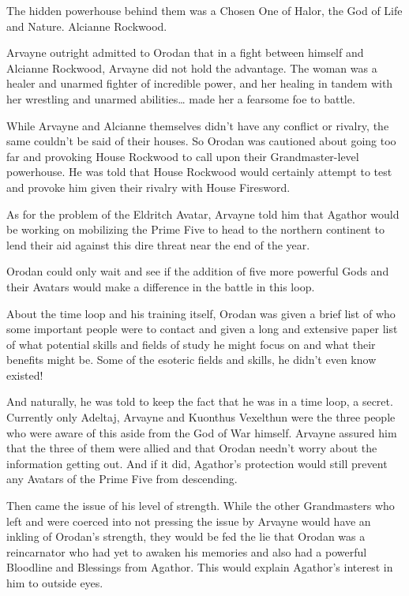 \documentclass[a4paper,10pt]{book}
\begin{document}
The hidden powerhouse behind them was a Chosen One of Halor, the God of Life and Nature. Alcianne Rockwood.\par
Arvayne outright admitted to Orodan that in a fight between himself and Alcianne Rockwood, Arvayne did not hold the advantage. The woman was a healer and unarmed fighter of incredible power, and her healing in tandem with her wrestling and unarmed abilities… made her a fearsome foe to battle.\par
While Arvayne and Alcianne themselves didn’t have any conflict or rivalry, the same couldn’t be said of their houses. So Orodan was cautioned about going too far and provoking House Rockwood to call upon their Grandmaster-level powerhouse. He was told that House Rockwood would certainly attempt to test and provoke him given their rivalry with House Firesword.\par
As for the problem of the Eldritch Avatar, Arvayne told him that Agathor would be working on mobilizing the Prime Five to head to the northern continent to lend their aid against this dire threat near the end of the year.\par
Orodan could only wait and see if the addition of five more powerful Gods and their Avatars would make a difference in the battle in this loop.\par
About the time loop and his training itself, Orodan was given a brief list of who some important people were to contact and given a long and extensive paper list of what potential skills and fields of study he might focus on and what their benefits might be. Some of the esoteric fields and skills, he didn’t even know existed!\par
And naturally, he was told to keep the fact that he was in a time loop, a secret. Currently only Adeltaj, Arvayne and Kuonthus Vexelthun were the three people who were aware of this aside from the God of War himself. Arvayne assured him that the three of them were allied and that Orodan needn’t worry about the information getting out. And if it did, Agathor’s protection would still prevent any Avatars of the Prime Five from descending.\par
Then came the issue of his level of strength. While the other Grandmasters who left and were coerced into not pressing the issue by Arvayne would have an inkling of Orodan’s strength, they would be fed the lie that Orodan was a reincarnator who had yet to awaken his memories and also had a powerful Bloodline and Blessings from Agathor. This would explain Agathor’s interest in him to outside eyes.\par
\end{document}
